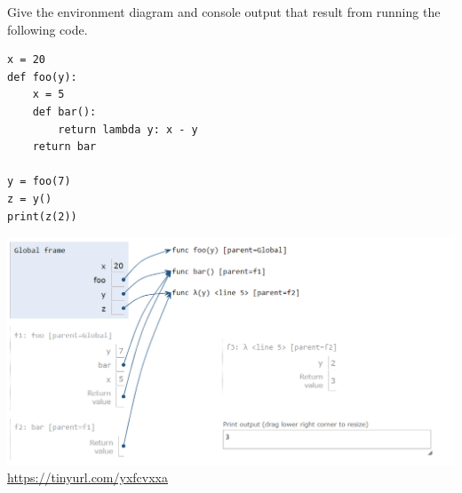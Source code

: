 \begin{blocksection}
\question Give the environment diagram and console output that result from running the following code.

\begin{lstlisting}
x = 20
def foo(y):
    x = 5
    def bar():
        return lambda y: x - y
    return bar

y = foo(7)
z = y()
print(z(2))
\end{lstlisting}

\begin{solution}[2in]
\includegraphics[scale=0.5]{foobar.png}
\\
\url{https://tinyurl.com/yxfcvxxa}
\end{solution}
\end{blocksection}